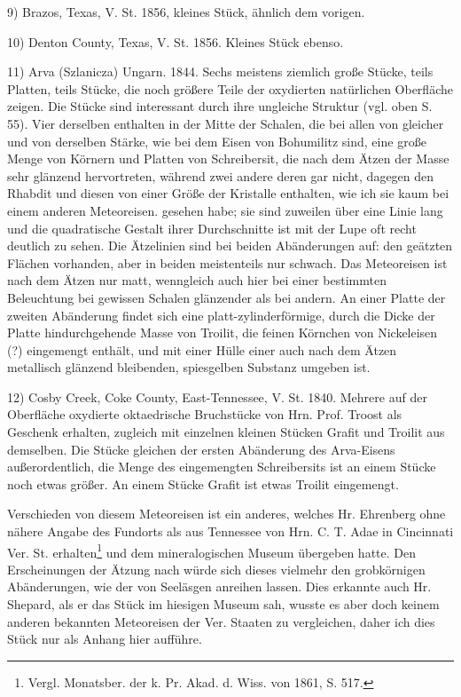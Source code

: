 \documentclass[a4paper, 11pt, oneside]{article}
\begin{document}
9) Brazos, Texas, V. St. 1856, kleines Stück, ähnlich dem vorigen.

10) Denton County, Texas, V. St. 1856. Kleines Stück ebenso.

11) Arva (Szlanicza) Ungarn. 1844. Sechs meistens ziemlich große Stücke, teils Platten, teils Stücke, die noch größere Teile der oxydierten natürlichen Oberfläche zeigen. Die Stücke sind interessant durch ihre ungleiche Struktur (vgl. oben S. 55). Vier derselben enthalten in der Mitte der Schalen, die bei allen von gleicher und von derselben Stärke, wie bei dem Eisen von Bohumilitz sind, eine große Menge von Körnern und Platten von Schreibersit, die nach dem Ätzen der Masse sehr glänzend hervortreten, während zwei andere deren gar nicht, dagegen den Rhabdit und diesen von einer Größe der Kristalle enthalten, wie ich sie kaum bei einem anderen Meteoreisen. gesehen habe; sie sind zuweilen über eine Linie lang und die quadratische Gestalt ihrer Durchschnitte ist mit der Lupe oft recht deutlich zu sehen. Die Ätzelinien sind bei beiden Abänderungen auf: den geätzten Flächen vorhanden, aber in beiden meistenteils nur schwach. Das Meteoreisen ist nach dem Ätzen nur matt, wenngleich auch hier bei einer bestimmten Beleuchtung bei gewissen Schalen glänzender als bei andern. An einer Platte der zweiten Abänderung findet sich eine platt-zylinderförmige, durch die Dicke der Platte hindurchgehende Masse von Troilit, die feinen Körnchen von Nickeleisen (?) eingemengt enthält, und mit einer Hülle einer auch nach dem Ätzen metallisch glänzend bleibenden, spiesgelben Substanz umgeben ist.

12) Cosby Creek, Coke County, East-Tennessee, V. St. 1840. Mehrere auf der Oberfläche oxydierte oktaedrische Bruchstücke von Hrn. Prof. Troost als Geschenk erhalten, zugleich mit einzelnen kleinen Stücken Grafit und Troilit aus demselben. Die Stücke gleichen der ersten Abänderung des Arva-Eisens außerordentlich, die Menge des eingemengten Schreibersits ist an einem Stücke noch etwas größer. An einem Stücke Grafit ist etwas Troilit eingemengt.

Verschieden von diesem Meteoreisen ist ein anderes, welches Hr. Ehrenberg ohne nähere Angabe des Fundorts als aus Tennessee von Hrn. C. T. Adae in Cincinnati Ver. St. erhalten\footnote{Vergl. Monatsber. der k. Pr. Akad. d. Wiss. von 1861, S. 517.} und dem mineralogischen Museum übergeben hatte. Den Erscheinungen der Ätzung nach würde sich dieses vielmehr den grobkörnigen Abänderungen, wie der von Seeläsgen anreihen lassen. Dies erkannte auch Hr. Shepard, als er das Stück im hiesigen Museum sah, wusste es aber doch keinem anderen bekannten Meteoreisen der Ver. Staaten zu vergleichen, daher ich dies Stück nur als Anhang hier aufführe.
\end{document}
